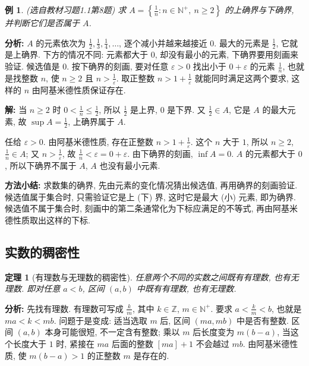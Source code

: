 \documentclass[UTF8,openany]{ctexbook}
\theoremstyle{chinesetextbook}
\newtheorem{example}{例}[section]
\newtheorem{theorem}{定理}[section]
\newenvironment{cnsolution}{\par\indent\textbf{解:} \ignorespaces}{\par}
\begin{document}
\begin{example}
\textnormal{(选自教材习题1.1第8题)} 求 $\displaystyle A=\left\{\frac1n:n\in\mathbb N^+,\ n\ge2\right\}$ 的上确界与下确界, 并判断它们是否属于 $A$.
\end{example}
\par\indent\textbf{分析:} $A$ 的元素依次为 $\displaystyle\frac12,\frac13,\frac14,\ldots$, 逐个减小并越来越接近 $0$. 最大的元素是 $\displaystyle\frac12$, 它就是上确界. 下方的情况不同: 元素都大于 $0$, 却没有最小的元素, 下确界要用刻画来验证. 候选值是 $0$. 按下确界的刻画, 要对任意 $\varepsilon>0$ 找出小于 $0+\varepsilon$ 的元素 $\displaystyle\frac1n$, 也就是找整数 $n$, 使 $n\ge2$ 且 $\displaystyle n>\frac1\varepsilon$. 取正整数 $\displaystyle n>1+\frac1\varepsilon$ 就能同时满足这两个要求, 这样的 $n$ 由阿基米德性质保证存在.
\begin{cnsolution}
当 $n\ge2$ 时 $\displaystyle0<\frac1n\le\frac12$, 所以 $\displaystyle\frac12$ 是上界, $0$ 是下界. 又 $\displaystyle\frac12\in A$, 它是 $A$ 的最大元素, 故 $\displaystyle\sup A=\frac12$, 上确界属于 $A$.

任给 $\varepsilon>0$. 由阿基米德性质, 存在正整数 $\displaystyle n>1+\frac1\varepsilon$. 这个 $n$ 大于 $1$, 所以 $n\ge2$, $\displaystyle\frac1n\in A$; 又 $\displaystyle n>\frac1\varepsilon$, 故 $\displaystyle\frac1n<\varepsilon=0+\varepsilon$. 由下确界的刻画, $\inf A=0$. $A$ 的元素都大于 $0$, 所以下确界不属于 $A$, $A$ 也没有最小元素.
\end{cnsolution}
\par\indent\textbf{方法小结:} 求数集的确界, 先由元素的变化情况猜出候选值, 再用确界的刻画验证. 候选值属于集合时, 只需验证它是上 (下) 界, 这时它是最大 (小) 元素, 即为确界. 候选值不属于集合时, 刻画中的第二条通常化为下标应满足的不等式, 再由阿基米德性质取出这样的下标.
\subsection{实数的稠密性}
\begin{theorem}[有理数与无理数的稠密性]
任意两个不同的实数之间既有有理数, 也有无理数. 即对任意 $a<b$, 区间 $(a,b)$ 中既有有理数, 也有无理数.
\end{theorem}
\par\indent\textbf{分析:} 先找有理数. 有理数可写成 $\displaystyle\frac km$, 其中 $k\in\mathbb Z$, $m\in\mathbb N^+$. 要求 $\displaystyle a<\frac km<b$, 也就是 $ma<k<mb$. 问题于是变成: 适当选取 $m$ 后, 区间 $(ma,mb)$ 中是否有整数. 区间 $(a,b)$ 本身可能很短, 不一定含有整数; 乘以 $m$ 后长度变为 $m(b-a)$, 当这个长度大于 $1$ 时, 紧接在 $ma$ 后面的整数 $[ma]+1$ 不会越过 $mb$. 由阿基米德性质, 使 $m(b-a)>1$ 的正整数 $m$ 是存在的.
\end{document}
